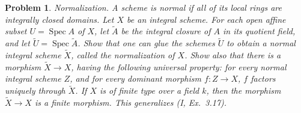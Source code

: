 \documentclass[12pt,letterpaper]{article}
\newtheorem{problem}{Problem}[section]
\theoremstyle{definition}
\theoremstyle{remark}
\numberwithin{equation}{section}
\numberwithin{figure}{problem}
\DeclareMathOperator{\Spec}{Spec}
\begin{document}
\begin{problem}
  \emph{Normalization}. A scheme is \emph{normal} if all of its local rings are integrally closed domains. Let $X$ be an integral scheme. For each open affine subset $U = \Spec A$ of $X$, let $\tilde{A}$ be the integral closure of $A$ in its quotient field, and let $\tilde{U} = \Spec \tilde{A}$. Show that one can glue the schemes $\tilde{U}$ to obtain a normal integral scheme $\tilde{X}$, called the \emph{normalization} of $X$. Show also that there is a morphism $\tilde{X} \to X$, having the following universal property: for every normal integral scheme $Z$, and for every dominant morphism $f\colon Z \to X$, $f$ factors uniquely through $\tilde{X}$. If $X$ is of finite type over a field $k$, then the morphism $\tilde{X} \to X$ is a finite morphism. This generalizes \emph{(I, Ex.~3.17)}.
\end{problem}
\end{document}
